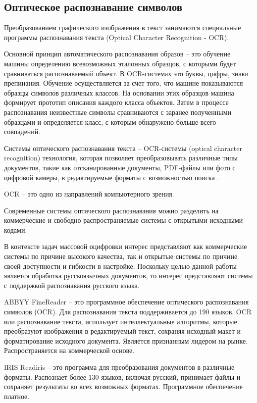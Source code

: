 \subsection{Оптическое распознавание символов}

Преобразованием графического изображения в текст занимаются специальные программы распознавания текста (Optical Character Recognition - OCR).

Основной принцип автоматического распознавания образов -- это обучение машины определению всевозможных эталонных образцов, с
которыми будет сравниваться распознаваемый объект. В OCR-системах это буквы, цифры, знаки препинания. Обучение осуществляется за счет того, что машине показываются образцы символов различных классов. На основании этих образцов машина формирует прототип описания каждого
класса объектов. Затем в процессе распознавания неизвестные символы сравниваются с заранее полученными образцами и определяется класс, с
которым обнаружено больше всего совпадений.

Системы оптического распознавания текста -- OCR-системы (optical character recognition) технология, которая позволяет преобразовывать различные типы документов, такие как отсканированные документы, PDF-файлы или фото с цифровой камеры, в редактируемые форматы с возможностью поиска \cite{ocr}. 

OCR -- это одно из направлений компьютерного зрения. 

Современные системы оптического распознавания можно разделить на коммерческие и свободно распространяемые системы с открытыми исходными кодами.

В контексте задач массовой оцифровки интерес представляют как коммерческие системы по причине высокого качества, так и открытые системы по причине своей доступности и гибкости в настройке. Поскольку целью данной работы является обработка русскоязычных документов, то интерес представляют системы с поддержкой распознавания русского языка.

ABBYY FineReader \cite{finereader} -- это программное обеспечение оптического распознавания символов (OCR). Для распознавания текста поддерживается до 190 языков. OCR или распознавание текста, использует интеллектуальные алгоритмы, которые преобразуют изображения в редактируемый текст, сохраняя исходный макет и форматирование исходного документа. Является признанным лидером на рынке. Распространяется на коммерческой основе.

IRIS Readiris \cite{readiris} -- это программа для преобразования документов в различные форматы. Распознает более 130 языков, включая русский, принимает файлы и сохраняет результаты во всех возможных форматах. Программное обеспечение платное. 

